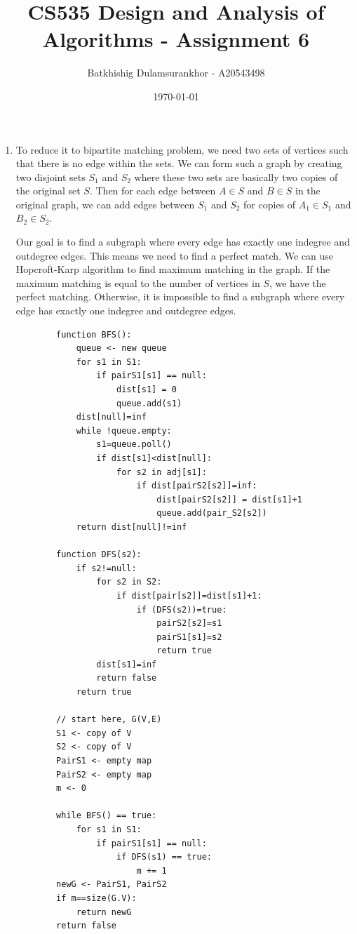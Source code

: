 \documentclass{article}
\title{CS535 Design and Analysis of Algorithms - Assignment 6}
\author{Batkhishig Dulamsurankhor - A20543498}
\date{\today} %
\begin{document}
\maketitle

\begin{enumerate}
    \item To reduce it to bipartite matching problem, we need two sets of vertices such that there is no edge within the sets.
    We can form such a graph by creating two disjoint sets $S_1$ and $S_2$ where these two sets are basically two copies of the original set $S$.
    Then for each edge between $A \in S$ and $B \in S$ in the original graph, we can add edges between $S_1$ and $S_2$ for copies of $A_1 \in S_1$ and $B_2 \in S_2$.

    Our goal is to find a subgraph where every edge has exactly one indegree and outdegree edges.
    This means we need to find a perfect match.
    We can use Hopcroft-Karp algorithm to find maximum matching in the graph.
    If the maximum matching is equal to the number of vertices in $S$, we have the perfect matching.
    Otherwise, it is impossible to find a subgraph where every edge has exactly one indegree and outdegree edges.

    \begin{lstlisting}
        function BFS():
            queue <- new queue
            for s1 in S1:
                if pairS1[s1] == null:
                    dist[s1] = 0
                    queue.add(s1)
            dist[null]=inf
            while !queue.empty:
                s1=queue.poll()
                if dist[s1]<dist[null]:
                    for s2 in adj[s1]:
                        if dist[pairS2[s2]]=inf:
                            dist[pairS2[s2]] = dist[s1]+1
                            queue.add(pair_S2[s2])
            return dist[null]!=inf

        function DFS(s2):
            if s2!=null:
                for s2 in S2:
                    if dist[pair[s2]]=dist[s1]+1:
                        if (DFS(s2))=true:
                            pairS2[s2]=s1
                            pairS1[s1]=s2
                            return true
                dist[s1]=inf
                return false
            return true

        // start here, G(V,E)
        S1 <- copy of V
        S2 <- copy of V
        PairS1 <- empty map
        PairS2 <- empty map
        m <- 0

        while BFS() == true:
            for s1 in S1:
                if pairS1[s1] == null:
                    if DFS(s1) == true:
                        m += 1
        newG <- PairS1, PairS2
        if m==size(G.V):
            return newG
        return false


\end{lstlisting}
\end{enumerate}
\end{document}
